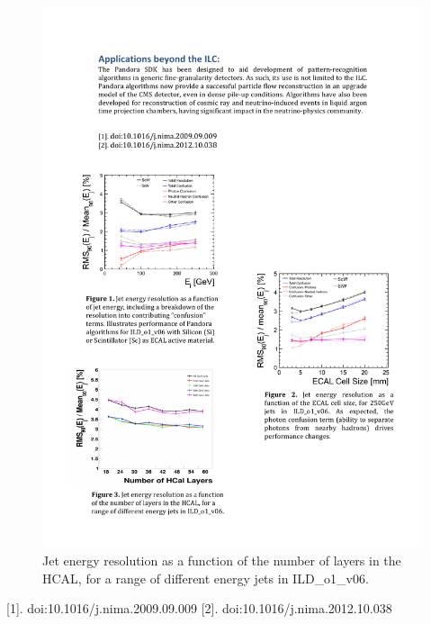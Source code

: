 \begin{figure}
\includegraphics{Software/PandoraPFA/HCAL_Layers}
\caption{Jet energy resolution as a function of the number of layers in the HCAL, for a range of different energy jets in ILD_o1_v06.}
\label{fig:Software:PandoraPFA:HCalLayers}
\end{figure}

[1]. doi:10.1016/j.nima.2009.09.009
[2]. doi:10.1016/j.nima.2012.10.038
